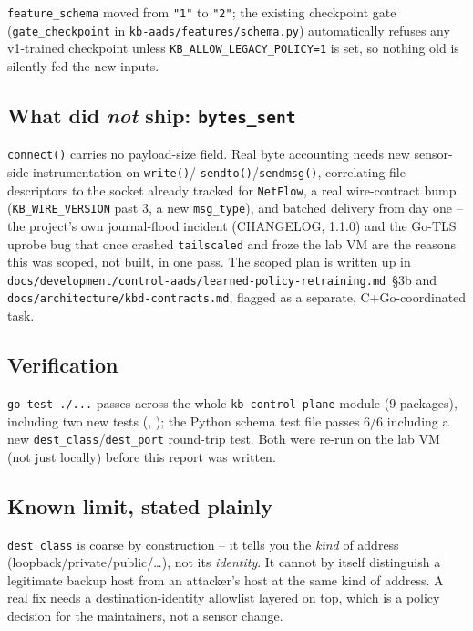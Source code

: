 \documentclass[11pt,a4paper]{article}
\begin{document}
\texttt{feature\_schema} moved from \texttt{"1"} to \texttt{"2"}; the
existing checkpoint gate (\texttt{gate\_checkpoint} in
\texttt{kb-aads/features/schema.py}) automatically refuses any
v1-trained checkpoint unless \texttt{KB\_ALLOW\_LEGACY\_POLICY=1} is set,
so nothing old is silently fed the new inputs.

\subsection*{What did \emph{not} ship: \texttt{bytes\_sent}}
\texttt{connect()} carries no payload-size field. Real byte accounting
needs new sensor-side instrumentation on \texttt{write()}/
\texttt{sendto()}/\texttt{sendmsg()}, correlating file descriptors to the
socket already tracked for \texttt{NetFlow}, a real wire-contract bump
(\texttt{KB\_WIRE\_VERSION} past 3, a new \texttt{msg\_type}), and
batched delivery from day one -- the project's own journal-flood incident
(CHANGELOG, 1.1.0) and the Go-TLS uprobe bug that once crashed
\texttt{tailscaled} and froze the lab VM are the reasons this was scoped,
not built, in one pass. The scoped plan is written up in
\texttt{docs/development/control-aads/learned-policy-retraining.md}~\S3b
and \texttt{docs/architecture/kbd-contracts.md}, flagged as a separate,
C+Go-coordinated task.

\subsection*{Verification}
\texttt{go test ./...} passes across the whole \texttt{kb-control-plane}
module (9 packages), including two new tests
(,
); the Python
schema test file passes 6/6 including a new
\texttt{dest\_class}/\texttt{dest\_port} round-trip test. Both were
re-run on the lab VM (not just locally) before this report was written.

\subsection*{Known limit, stated plainly}
\texttt{dest\_class} is coarse by construction -- it tells you the
\emph{kind} of address (loopback/private/public/\ldots), not its
\emph{identity}. It cannot by itself distinguish a legitimate backup host
from an attacker's host at the same kind of address. A real fix needs a
destination-identity allowlist layered on top, which is a policy
decision for the maintainers, not a sensor change.
\end{document}
